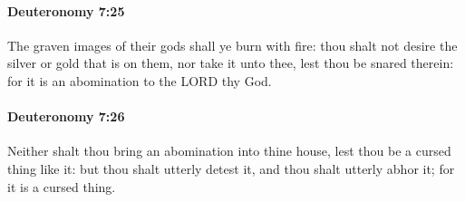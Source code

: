 		\paragraph{Deuteronomy 7:25} %
			\label{DEUTERONOMY-7-25}

			The graven images of their gods shall ye burn with fire: thou shalt not desire the silver or gold that is on them, nor take it unto thee, lest thou be snared therein: for it is an abomination to the LORD thy God.


		\paragraph{Deuteronomy 7:26} %
			\label{DEUTERONOMY-7-26}

			Neither shalt thou bring an abomination into thine house, lest thou be a cursed thing like it: but thou shalt utterly detest it, and thou shalt utterly abhor it; for it is a cursed thing.

